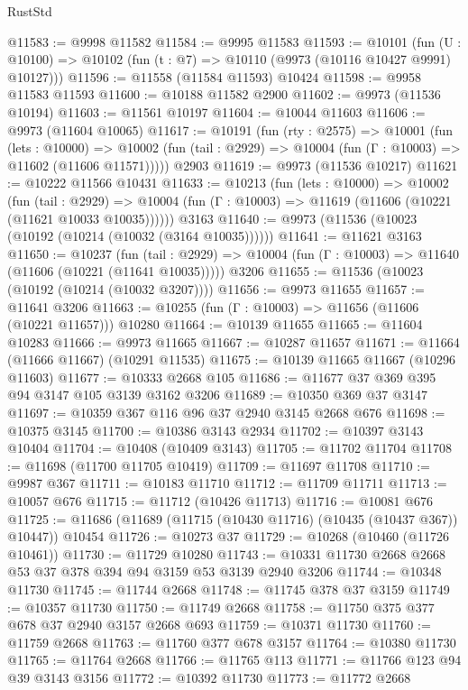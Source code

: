 \begin{lexlean}{RustStd}
\begin{coremodule}
@11583 := @9998 @11582
@11584 := @9995 @11583
@11593 := @10101
    (fun (U : @10100) => @10102 (fun (t : @7) => @10110 (@9973 (@10116 @10427 @9991) @10127)))
@11596 := @11558 (@11584 @11593) @10424
@11598 := @9958 @11583 @11593
@11600 := @10188 @11582 @2900
@11602 := @9973 (@11536 @10194)
@11603 := @11561 @10197
@11604 := @10044 @11603
@11606 := @9973 (@11604 @10065)
@11617 := @10191
    (fun (rty : @2575) =>
    @10001
      (fun (lets : @10000) =>
      @10002 (fun (tail : @2929) => @10004 (fun (Γ : @10003) => @11602 (@11606 @11571)))))
    @2903
@11619 := @9973 (@11536 @10217)
@11621 := @10222 @11566 @10431
@11633 := @10213
    (fun (lets : @10000) =>
    @10002
      (fun (tail : @2929) =>
      @10004 (fun (Γ : @10003) => @11619 (@11606 (@10221 (@11621 @10033 @10035))))))
    @3163
@11640 := @9973 (@11536 (@10023 (@10192 (@10214 (@10032 (@3164 @10035))))))
@11641 := @11621 @3163
@11650 := @10237
    (fun (tail : @2929) => @10004 (fun (Γ : @10003) => @11640 (@11606 (@10221 (@11641 @10035)))))
    @3206
@11655 := @11536 (@10023 (@10192 (@10214 (@10032 @3207))))
@11656 := @9973 @11655
@11657 := @11641 @3206
@11663 := @10255 (fun (Γ : @10003) => @11656 (@11606 (@10221 @11657))) @10280
@11664 := @10139 @11655
@11665 := @11604 @10283
@11666 := @9973 @11665
@11667 := @10287 @11657
@11671 := @11664 (@11666 @11667) (@10291 @11535)
@11675 := @10139 @11665 @11667 (@10296 @11603)
@11677 := @10333 @2668 @105
@11686 := @11677 @37 @369 @395 @94 @3147 @105 @3139 @3162 @3206
@11689 := @10350 @369 @37 @3147
@11697 := @10359 @367 @116 @96 @37 @2940 @3145 @2668 @676
@11698 := @10375 @3145
@11700 := @10386 @3143 @2934
@11702 := @10397 @3143 @10404
@11704 := @10408 (@10409 @3143)
@11705 := @11702 @11704
@11708 := @11698 (@11700 @11705 @10419)
@11709 := @11697 @11708
@11710 := @9987 @367
@11711 := @10183 @11710
@11712 := @11709 @11711
@11713 := @10057 @676
@11715 := @11712 (@10426 @11713)
@11716 := @10081 @676
@11725 := @11686 (@11689 (@11715 (@10430 @11716) (@10435 (@10437 @367)) @10447)) @10454
@11726 := @10273 @37
@11729 := @10268 (@10460 (@11726 @10461))
@11730 := @11729 @10280
@11743 := @10331 @11730 @2668 @2668 @53 @37 @378 @394 @94 @3159 @53 @3139 @2940 @3206
@11744 := @10348 @11730
@11745 := @11744 @2668
@11748 := @11745 @378 @37 @3159
@11749 := @10357 @11730
@11750 := @11749 @2668
@11758 := @11750 @375 @377 @678 @37 @2940 @3157 @2668 @693
@11759 := @10371 @11730
@11760 := @11759 @2668
@11763 := @11760 @377 @678 @3157
@11764 := @10380 @11730
@11765 := @11764 @2668
@11766 := @11765 @113
@11771 := @11766 @123 @94 @39 @3143 @3156
@11772 := @10392 @11730
@11773 := @11772 @2668

\end{coremodule}
\end{lexlean}
